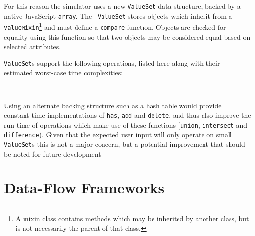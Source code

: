 \documentclass[bsc,twoside,singlespacing,parskip,logo,notimes,normalheadings]{infthesis}
\begin{document}
    For this reason the simulator uses a new {\tt ValueSet} data
    structure, backed by a native JavaScript {\tt array}. The {\tt
      ValueSet} stores objects which inherit from a {\tt
      ValueMixin}\footnote{A mixin class contains methods which may be
      inherited by another class, but is not necessarily the parent of
      that class.} and must define a {\tt compare} function. Objects
    are checked for equality using this function so that two objects
    may be considered equal based on selected attributes.

    {\tt ValueSet}s support the following operations, listed here
    along with their estimated worst-case time complexities:

    \begin{table}[!ht]
      \centering
      \def\arraystretch{1.2}
      \\[2mm]
    \end{table}

    Using an alternate backing structure such as a hash table would
    provide constant-time implementations of {\tt has}, {\tt add} and
    {\tt delete}, and thus also improve the run-time of operations
    which make use of these functions ({\tt union}, {\tt intersect}
    and {\tt difference}). Given that the expected user input will
    only operate on small {\tt ValueSet}s this is not a major concern,
    but a potential improvement that should be noted for future
    development.
    
    \section{Data-Flow Frameworks}\label{sec:impl-dataflows}
    
\end{document}
